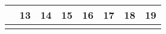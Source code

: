 {\begin{tabularx}{\linewidth}{|l!{\vrule width \myLenLineThicknessThick}*{7}{@{}X@{}|}}
      
        \\  \hline 
      
    
  
  
  
  \hyperlink{week-2027-37}{} &
    
      
      
        \begin{minipage}[t]{6mm}\centering{}13\end{minipage}
      
       & 
    
      
      
        \begin{minipage}[t]{6mm}\centering{}14\end{minipage}
      
       & 
    
      
      
        \begin{minipage}[t]{6mm}\centering{}15\end{minipage}
      
       & 
    
      
      
        \begin{minipage}[t]{6mm}\centering{}16\end{minipage}
      
       & 
    
      
      
        \begin{minipage}[t]{6mm}\centering{}17\end{minipage}
      
       & 
    
      
      
        \begin{minipage}[t]{6mm}\centering{}18\end{minipage}
      
       & 
    
      
      
        \begin{minipage}[t]{6mm}\centering{}19\end{minipage}
      
      
        \\  \hline 
      
    
  
  
  
  \hyperlink{week-2027-38}{} &
    

\end{tabularx}}
